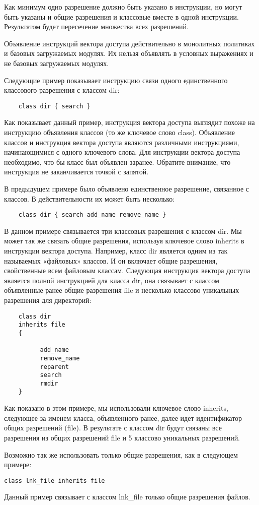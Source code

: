 \documentclass{./../class/UIR}
\begin{document}
Как минимум одно разрешение должно быть указано в инструкции, но могут быть
указаны и общие разрешения и классовые вместе в одной инструкции. Результатом
будет пересечение множества всех разрешений.

Объявление инструкций вектора доступа действительно в монолитных политиках и
базовых загружаемых модулях. Их нельзя объявлять в условных выражениях и не
базовых загружаемых модулях.

Следующие пример показывает инструкцию связи одного единственного классового
разрешения с классом dir:
	\begin{verbatim}
	class dir { search }
	\end{verbatim}
Как показывает данный пример, инструкция вектора доступа выглядит похоже на
инструкцию объявления классов (то же ключевое слово class). Объявление классов и
инструкция вектора доступа являются различными инструкциями, начинающимися с
одного ключевого слова. Для инструкции вектора доступа необходимо, что бы класс
был объявлен заранее. Обратите внимание, что инструкция не заканчивается точкой
с запятой.

В предыдущем примере было объявлено единственное разрешение, связанное с
классов. В действительности их может быть несколько:
	\begin{verbatim}
	class dir { search add_name remove_name }
	\end{verbatim}
В данном примере связывается три классовых разрешения с классом dir. Мы может
так же связать общие разрешения, используя ключевое слово inherits в инструкции
вектора доступа. Например, класс dir является одним из так называемых «файловых»
классов. И он включает общие разрешения, свойственные всем файловым классам.
Следующая инструкция вектора доступа является полной инструкцией для класса dir,
она связывает с классом объявленные ранее общие разрешения file и несколько
классово уникальных разрешения для директорий:
	\begin{verbatim}
	class dir
	inherits file
	{

	      add_name
  		  remove_name
	      reparent
	      search
	      rmdir
	}
	\end{verbatim}
Как показано в этом примере, мы использовали ключевое слово inherits, следующее
за именем класса, объявленного ранее, далее идет идентификатор общих разрешений
(file). В результате с классом dir будут связаны все разрешения из общих
разрешений file и 5 классово уникальных разрешений.

Возможно так же использовать только общие разрешения, как в следующем примере:
\begin{verbatim}
class lnk_file inherits file
\end{verbatim}
Данный пример связывает с классом lnk\_file только общие разрешения файлов. 
    
\end{document}
